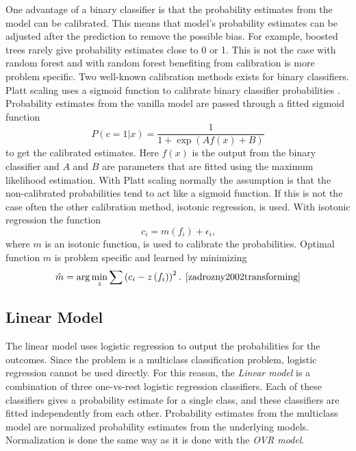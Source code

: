 One advantage of a binary classifier is that the probability estimates from the model can be calibrated. This means that model's probability estimates can be adjusted after the prediction to remove the possible bias. For example, boosted trees rarely give probability estimates close to 0 or 1. This is not the case with random forest and with random forest benefiting from calibration is more problem specific. \cite{niculescu2005predicting} Two well-known calibration methods exists for binary classifiers. Platt scaling uses a sigmoid function to calibrate binary classifier probabilities \cite{platt1999probabilistic}. Probability estimates from the vanilla model are passed through a fitted sigmoid function
\begin{equation}
P ( c = 1 | x ) = \frac { 1 } { 1 + \exp ( A f(x) + B ) }
\end{equation}
to get the calibrated estimates. Here $f(x)$ is the output from the binary classifier and $A$ and $B$ are parameters that are fitted using the maximum likelihood estimation. With Platt scaling normally the assumption is that the non-calibrated probabilities tend to act like a sigmoid function. If this is not the case often the other calibration method, isotonic regression, is used. With isotonic regression the function
\begin{equation}
c _ { i } = m \left( f _ { i } \right) + \epsilon _ { i } \text{,}
\end{equation}
where $m$ is an isotonic function, is used to calibrate the probabilities. Optimal function $m$ is problem specific and learned by minimizing
\begin{equation}
\hat { m } = \arg \min _ { z } \sum \left( c _ { i } - z \left( f _ { i } \right) \right) ^ { 2 } \text{. \cite{zadrozny2002transforming}}
\end{equation}

\subsection{Linear Model}
The linear model uses logistic regression to output the probabilities for the outcomes. Since the problem is a multiclass classification problem, logistic regression cannot be used directly. For this reason, the \textit{Linear model} is a combination of three one-vs-rest logistic regression classifiers. Each of these classifiers gives a probability estimate for a single class, and these classifiers are fitted independently from each other. Probability estimates from the multiclass model are normalized probability estimates from the underlying models. Normalization is done the same way as it is done with the \textit{OVR model}.

